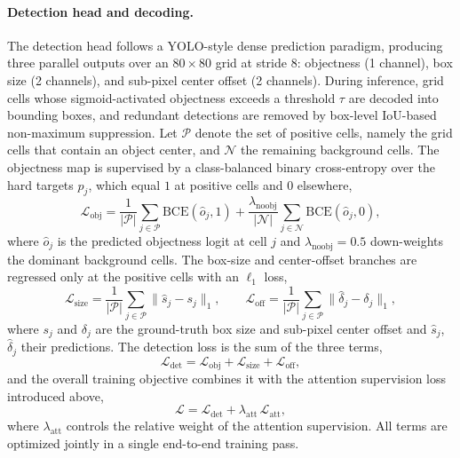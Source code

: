 \documentclass[lettersize,journal]{IEEEtran}
\begin{document}
\paragraph{Detection head and decoding.}
The detection head follows a YOLO-style dense prediction paradigm, 
producing three parallel outputs over an $80\times80$ grid at stride 8: 
objectness (1 channel), box size (2 channels), and sub-pixel center offset (2 channels). 
During inference, grid cells whose sigmoid-activated objectness exceeds a threshold $\tau$ are decoded into bounding boxes, 
and redundant detections are removed by box-level IoU-based non-maximum suppression. 
Let $\mathcal{P}$ denote the set of positive cells, namely the grid cells that contain an object center, and $\mathcal{N}$ the remaining background cells.
The objectness map is supervised by a class-balanced binary cross-entropy over the hard targets $p_j$, which equal $1$ at positive cells and $0$ elsewhere,
\begin{equation}
\mathcal{L}_{\mathrm{obj}} = \frac{1}{|\mathcal{P}|}\sum_{j\in\mathcal{P}} \mathrm{BCE}(\hat{o}_j, 1)
+ \frac{\lambda_{\mathrm{noobj}}}{|\mathcal{N}|}\sum_{j\in\mathcal{N}} \mathrm{BCE}(\hat{o}_j, 0),
\end{equation}
where $\hat{o}_j$ is the predicted objectness logit at cell $j$ and $\lambda_{\mathrm{noobj}}=0.5$ down-weights the dominant background cells.
The box-size and center-offset branches are regressed only at the positive cells with an $\ell_1$ loss,
\begin{equation}
\mathcal{L}_{\mathrm{size}} = \frac{1}{|\mathcal{P}|}\sum_{j\in\mathcal{P}} \lVert \hat{s}_j - s_j \rVert_1,
\qquad
\mathcal{L}_{\mathrm{off}} = \frac{1}{|\mathcal{P}|}\sum_{j\in\mathcal{P}} \lVert \hat{\delta}_j - \delta_j \rVert_1,
\end{equation}
where $s_j$ and $\delta_j$ are the ground-truth box size and sub-pixel center offset and $\hat{s}_j$, $\hat{\delta}_j$ their predictions.
The detection loss is the sum of the three terms,
\begin{equation}
\mathcal{L}_{\mathrm{det}} = \mathcal{L}_{\mathrm{obj}} + \mathcal{L}_{\mathrm{size}} + \mathcal{L}_{\mathrm{off}},
\end{equation}
and the overall training objective combines it with the attention supervision loss introduced above,
\begin{equation}
\mathcal{L} = \mathcal{L}_{\mathrm{det}} + \lambda_{\mathrm{att}}\, \mathcal{L}_{\mathrm{att}},
\end{equation}
where $\lambda_{\mathrm{att}}$ controls the relative weight of the attention supervision. All terms are optimized jointly in a single end-to-end training pass.
\end{document}
